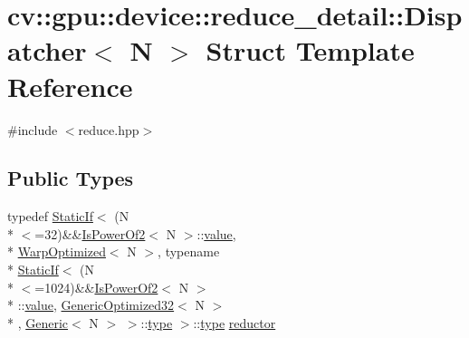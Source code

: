 \hypertarget{structcv_1_1gpu_1_1device_1_1reduce__detail_1_1Dispatcher}{\section{cv\-:\-:gpu\-:\-:device\-:\-:reduce\-\_\-detail\-:\-:Dispatcher$<$ N $>$ Struct Template Reference}
\label{structcv_1_1gpu_1_1device_1_1reduce__detail_1_1Dispatcher}
}


{\ttfamily \#include $<$reduce.\-hpp$>$}

\subsection*{Public Types}
\begin{DoxyCompactItemize}
\item 
typedef \hyperlink{structcv_1_1gpu_1_1device_1_1reduce__detail_1_1StaticIf}{Static\-If}$<$ (N\\*
$<$=32)\&\&\hyperlink{structcv_1_1gpu_1_1device_1_1reduce__detail_1_1IsPowerOf2}{Is\-Power\-Of2}$<$ N $>$\-::\hyperlink{highgui__c_8h_ad4670c92695d4327c21292905a803901}{value}, \\*
\hyperlink{structcv_1_1gpu_1_1device_1_1reduce__detail_1_1WarpOptimized}{Warp\-Optimized}$<$ N $>$, typename \\*
\hyperlink{structcv_1_1gpu_1_1device_1_1reduce__detail_1_1StaticIf}{Static\-If}$<$ (N\\*
$<$=1024)\&\&\hyperlink{structcv_1_1gpu_1_1device_1_1reduce__detail_1_1IsPowerOf2}{Is\-Power\-Of2}$<$ N $>$\\*
\-::\hyperlink{highgui__c_8h_ad4670c92695d4327c21292905a803901}{value}, \hyperlink{structcv_1_1gpu_1_1device_1_1reduce__detail_1_1GenericOptimized32}{Generic\-Optimized32}$<$ N $>$\\*
, \hyperlink{structcv_1_1gpu_1_1device_1_1reduce__detail_1_1Generic}{Generic}$<$ N $>$ $>$\-::\hyperlink{imgproc__c_8h_a84612d8738bf935200cf32a103d8efe1}{type} $>$\-::\hyperlink{imgproc__c_8h_a84612d8738bf935200cf32a103d8efe1}{type} \hyperlink{structcv_1_1gpu_1_1device_1_1reduce__detail_1_1Dispatcher_ae22f9b091301817a504b822aab5a0d81}{reductor}
\end{DoxyCompactItemize}


